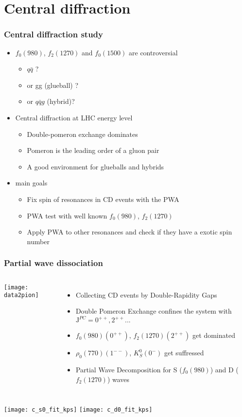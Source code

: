 \section{Central diffraction}

\begin{frame}
\frametitle{Central diffraction study}

\begin{itemize}
	\item{$f_0(980)$, $f_2(1270)$ and $f_0(1500)$ are controversial}
	\begin{itemize}
		\item $q\bar{q}$ ?
		\item or gg (glueball) ?
		\item or $q\bar{q}g$ (hybrid)?
	\end{itemize}
	\item{Central diffraction at LHC energy level}
	\begin{itemize}
		\item Double-pomeron exchange dominates
		\item Pomeron is the leading order of a gluon pair
		\item A good environment for glueballs and hybrids
	\end{itemize}
	\item{main goals}
	\begin{itemize}
		\item Fix spin of resonances in CD events with the PWA
		\item PWA test with well known $f_0(980)$, $f_2(1270)$ 
		\item Apply PWA to other resonances and check if they have a exotic spin number
	\end{itemize}
	
\end{itemize}

\end{frame}

\begin{frame}[c]
\frametitle{Partial wave dissociation}
\begin{columns}[c]
\texttt{[image: data2pion]}
\tiny
\begin{itemize}
\item Collecting CD events by Double-Rapidity Gaps
\item Double Pomeron Exchange confines the system with $\mathrm{J}^{PC} = 0^{++}, 2^{++}...$
\item $f_0(980) ( 0^{++})$, $f_2(1270) ( 2^{++})$ get dominated
\item $\rho_0(770) ( 1^{- -})$, $K^0_{S} ( 0^{-})$ get suffressed
\item Partial Wave Decomposition for S ($f_0(980)$) and D ($f_2(1270)$) waves 
\end{itemize}
\end{columns}
\texttt{[image: c\_s0\_fit\_kps]}
\texttt{[image: c\_d0\_fit\_kps]}
\end{frame}



